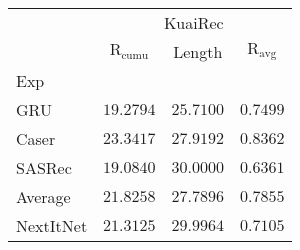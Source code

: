 \begin{tabular}{lccc}
 & \multicolumn{3}{c}{KuaiRec} \\
 & $\text{R}_\text{cumu}$ & Length & $\text{R}_\text{avg}$ \\
Exp &  &  &  \\
GRU & $19.2794$ & $25.7100$ & $0.7499$ \\
Caser & $\mathbf{23.3417}$ & $27.9192$ & $\mathbf{0.8362}$ \\
SASRec & $19.0840$ & $\mathbf{30.0000}$ & $0.6361$ \\
Average & \underline{$21.8258$} & $27.7896$ & \underline{$0.7855$} \\
NextItNet & $21.3125$ & \underline{$29.9964$} & $0.7105$ \\
\end{tabular}
